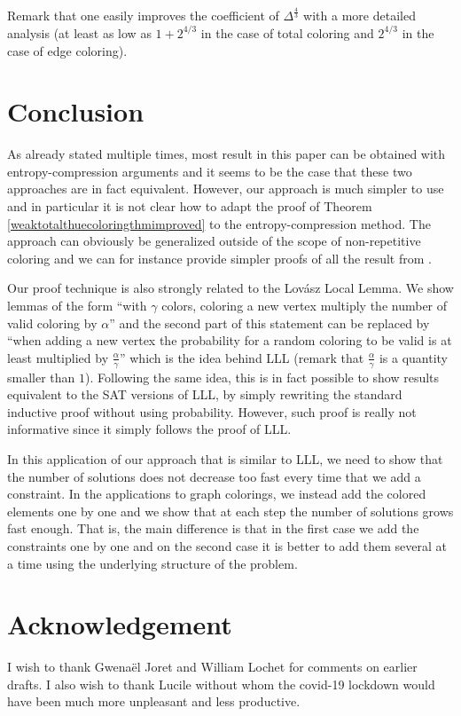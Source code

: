 \documentclass[a4paper,10pt]{article}
\begin{document}
Remark that one easily improves the coefficient of $\Delta^\frac{4}{3}$  with a more detailed analysis (at least as low as $1+2^{4/3}$ in the case of total coloring and $2^{4/3}$ in the case of edge coloring).


\section{Conclusion}
As already stated multiple times, most result in this paper can be obtained with entropy-compression arguments and it seems to be the case that these two approaches are in fact equivalent. 
However, our approach is much simpler to use and in particular it is not clear how to adapt the proof of Theorem \ref{weaktotalthuecoloringthmimproved} to the entropy-compression method.
The approach can obviously be generalized outside of the scope of non-repetitive coloring and we can for instance provide simpler proofs of all the result from \cite{ESPERET20131019}.

Our proof technique is also strongly related to the Lov\'asz Local Lemma.
We show lemmas of the form ``with $\gamma$ colors, coloring a new vertex multiply the number of valid coloring by $\alpha$'' and the second part of this statement can be replaced by ``when adding a new vertex the probability for a random coloring to be valid is at least multiplied by $\frac{\alpha}{\gamma}$'' which is the idea behind LLL (remark that $\frac{\alpha}{\gamma}$ is a quantity smaller than $1$). 
Following the same idea, this is in fact possible to show results equivalent to the SAT versions of LLL, by simply rewriting the standard inductive proof without using probability. However, such proof is really not informative since it simply follows the proof of LLL.

In this application of our approach that is similar to LLL, we need to show that the number of solutions does not decrease too fast every time that we add a constraint. In the applications to graph colorings, we instead add the colored elements one by one and we show that at each step the number of solutions grows fast enough. That is, the main difference is that in the first case we add the constraints one by one and on the second case it is better to add them  several at a time using the underlying structure of the problem.  

\section*{Acknowledgement}
I wish to thank Gwena\"el Joret and William Lochet for comments on earlier drafts. 
I also wish to thank Lucile without whom the covid-19 lockdown would have been much more unpleasant and less productive.




\end{document}
